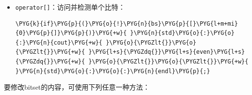 \begin{itemize}

\item \texttt{operator[]}：访问并检测单个比特：



\begin{codeblockbg}
\begin{Verbatim}[commandchars=\\\{\},breaklines=true,breakanywhere=true,fontsize=\codefont,xleftmargin=17bp]
\PYG{k}{if}\PYG{p}{(}\PYG{o}{!}\PYG{n}{bs}\PYG{p}{[}\PYG{l+m+mi}{0}\PYG{p}{]}\PYG{p}{)}\PYG{+w}{ }\PYG{n}{std}\PYG{o}{:}\PYG{o}{:}\PYG{n}{cout}\PYG{+w}{ }\PYG{o}{\PYGZlt{}}\PYG{o}{\PYGZlt{}}\PYG{+w}{ }\PYG{l+s}{\PYGZdq{}}\PYG{l+s}{even}\PYG{l+s}{\PYGZdq{}}\PYG{+w}{ }\PYG{o}{\PYGZlt{}}\PYG{o}{\PYGZlt{}}\PYG{+w}{ }\PYG{n}{std}\PYG{o}{:}\PYG{o}{:}\PYG{n}{endl}\PYG{p}{;}
\end{Verbatim}
\end{codeblockbg}

\end{itemize}



要修改bitset的内容，可使用下列任意一种方法：



